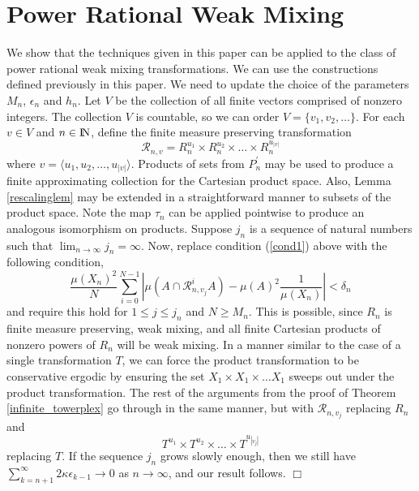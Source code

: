 \documentclass[12pt]{amsart}
\begin{document}
\section{Power Rational Weak Mixing}
We show that the techniques given in this paper can be applied 
to the class of power rational weak mixing transformations. 
We can use the constructions defined previously in this paper. 
We need to update the choice of the parameters 
$M_n$, $\epsilon_n$ and $h_n$. 
Let $V$ be the collection of all finite vectors 
comprised of nonzero integers.  The collection $V$ 
is countable, so we can order 
$V=\{ v_1, v_2, \ldots \}$. 
For each $v\in V$ and $n\in {\hbox{\rm\setbox1=\hbox{I}\copy1\kern-.45\wd1 N}}$, 
define the finite measure preserving transformation 
\[
\mathcal{R}_{n,v} = R_n^{u_1} \times R_n^{u_2} \times 
\ldots \times R_n^{u_{|v|}}
\]
where $v = \langle u_1,u_2,\ldots ,u_{|v|} \rangle$. 
Products of sets from $P_n^{\prime}$ may be used 
to produce a finite approximating collection 
for the Cartesian product space. 
Also, Lemma \ref{rescalinglem} may be extended 
in a straightforward manner to subsets 
of the product space. Note the map 
$\tau_n$ can be applied pointwise to produce 
an analogous isomorphism on products. 
Suppose $j_n$ is a sequence of natural numbers 
such that 
$\lim_{n\to \infty} j_n = \infty$. 
Now, replace condition (\ref{cond1}) above 
with the following condition, 
\[
\frac{\mu(X_n)^2}{N} \sum_{i=0}^{N-1} 
| \mu(A\cap \mathcal{R}_{n,v_j}^iA) - \mu(A)^2\frac{1}{\mu(X_n)} | 
< \delta_n 
\]
and require this hold for $1\leq j\leq j_n$ and $N \geq M_n$. 
This is possible, since $R_n$ is finite measure preserving, 
weak mixing, and all finite Cartesian products 
of nonzero powers of $R_n$ will be weak mixing. 
In a manner similar to the case of a single transformation $T$, 
we can force the product transformation to be 
conservative ergodic by ensuring the set 
$X_1\times X_1\times \ldots X_1$ sweeps out 
under the product transformation. 
The rest of the arguments from the proof of Theorem \ref{infinite_towerplex} 
go through in the same manner, but with 
$\mathcal{R}_{n,v_j}$ replacing $R_n$ and 
\[
T^{u_1}\times T^{u_2}\times \ldots \times T^{u_{|v_j|}}
\]
replacing $T$.  If the sequence $j_n$ grows slowly enough, 
then we still have 
$\sum_{k=n+1}^{\infty}2\kappa \epsilon_{k-1} \to 0$ as $n\to \infty$, 
and our result follows. $\Box$
\end{document}
